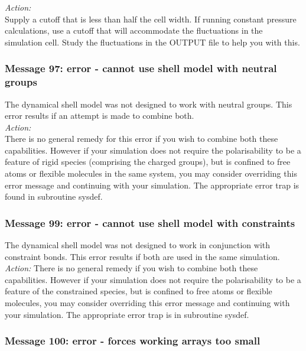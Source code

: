 \noindent
{\em Action:} \\ 
Supply a cutoff that is less than half the cell width. If running
constant pressure calculations, use a cutoff that will accommodate
the fluctuations in  the simulation cell. Study the fluctuations
in the OUTPUT file to help you with this.

\subsubsection*{Message 97: error - cannot use shell model with neutral
groups}

The dynamical shell model  was not designed to work with neutral
groups. This error results if an attempt is made to combine both. \\

\noindent
{\em Action:} \\
There is no general remedy for this error if you wish to
combine both these capabilities. However if your simulation does not
require the polarisability to be a feature of rigid species
(comprising the charged groups), but
is confined to free atoms or flexible molecules in the same system,
you may consider overriding this error message and continuing with
your simulation. The appropriate error trap is found in subroutine
{\sc sysdef}.

\subsubsection*{Message 99: error - cannot use shell model with
constraints}

The dynamical shell model was not designed to work in conjunction with
constraint bonds. This error results if both are used in the same
simulation. \\

\noindent
{\em Action:}
There is no general remedy if you wish to combine both these
capabilities. However if your simulation does not
require the polarisability to be a feature of the constrained species,
but is confined to free atoms or flexible molecules, you may
consider overriding this error message and continuing with your simulation.
The appropriate error trap is in subroutine {\sc sysdef}.

\subsubsection*{Message 100: error - forces working arrays too small}

